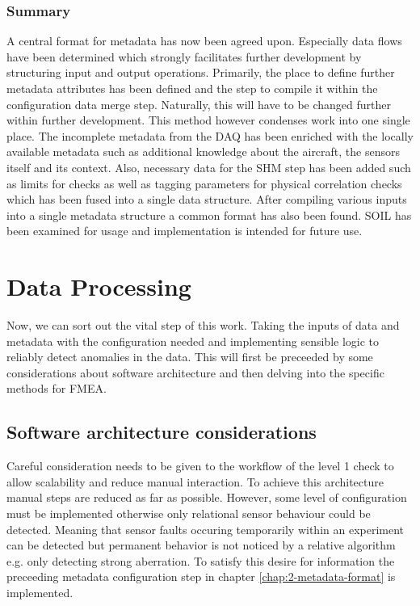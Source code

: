 \subsubsection{Summary}
A central format for metadata has now been agreed upon. Especially data flows have been determined which strongly facilitates further development by structuring input and output operations. Primarily, the place to define further metadata attributes has been defined and the step to compile it within the configuration data merge step. Naturally, this will have to be changed further within further development. This method however condenses work into one single place.
The incomplete metadata from the DAQ has been enriched with the locally available metadata such as additional knowledge about the aircraft, the sensors itself and its context. Also, necessary data for the SHM step has been added such as limits for checks as well as tagging parameters for physical correlation checks which has been fused into a single data structure.
After compiling various inputs into a single metadata structure a common format has also been found. SOIL has been examined for usage and implementation is intended for future use.

\newpage


\section{Data Processing}
Now, we can sort out the vital step of this work. Taking the inputs of data and metadata with the configuration needed and implementing sensible logic to reliably detect anomalies in the data. This will first be preceeded by some considerations about software architecture and then delving into the specific methods for FMEA.

\subsection{Software architecture considerations}


Careful consideration needs to be given to the workflow of the level 1 check to allow scalability and reduce manual interaction. To achieve this architecture manual steps are reduced as far as possible. However, some level of configuration must be implemented otherwise only relational sensor behaviour could be detected. Meaning that sensor faults occuring temporarily within an experiment can be detected but permanent behavior is not noticed by a relative algorithm e.g. only detecting strong aberration. To satisfy this desire for information the preceeding metadata configuration step in chapter \ref{chap:2-metadata-format} is implemented.

